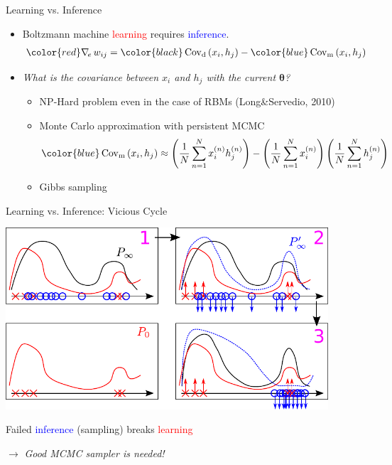 \documentclass{beamer}
\newcommand{\vects}[1]{\boldsymbol{#1}}
\newcommand{\cov}[0]{\operatorname{Cov}}
\newcommand{\td}[0]{\text{d}}
\newcommand{\tf}[0]{\text{m}}
\newcommand{\TT}[0]{{\vects{\theta}}}
\newcommand{\enhnabla}[0]{\nabla_{\hspace{-0.5mm}e}\,}
\newcommand{\tred}[1]{\textcolor{red}{#1}}
\newcommand{\tblue}[1]{\textcolor{blue}{#1}}
\begin{document}
\begin{frame}{Learning vs. Inference}
\begin{itemize}
    \item Boltzmann machine \tred{learning} requires
    \tblue{inference}.
    \begin{align*}
        {\color{red} \enhnabla w_{ij}} &= {\color{black}\cov_\td\left(x_i,
        h_j\right)}
        - {\color{blue}\cov_\tf\left(x_i, h_j\right)}
    \end{align*}
    \end{itemize}

    \begin{itemize}
        \item \emph{What is the covariance between $x_i$ and $h_j$ with the
    current $\TT$?} 
    \begin{itemize}
        \item NP-Hard problem even in the case of RBMs {\small (Long\&Servedio, 2010)}
        \item Monte Carlo approximation with persistent MCMC
            \[
            {\color{blue}\cov_\tf\left(x_i, h_j\right)}
            \approx
            \left(\frac{1}{N} \sum_{n=1}^N x_i^{(n)}
            h_j^{(n)}\right) - 
            \left( 
            \frac{1}{N} \sum_{n=1}^N x_i^{(n)} 
            \right)
            \left(\frac{1}{N}
            \sum_{n=1}^N h_j^{(n)}
            \right)
            \]
        \item Gibbs sampling
    \end{itemize}
    \end{itemize}
\end{frame}

\begin{frame}{Learning vs. Inference: Vicious Cycle}

    \begin{center}
        \includegraphics[width=0.9\textwidth]{vicious_cycle_bm.pdf}
    \end{center}

    \raggedright
    Failed \tblue{inference} (sampling) breaks
            \tred{learning} 

    \raggedleft
            $\to$ \emph{Good MCMC sampler is
            needed!}

\end{frame}
\end{document}
